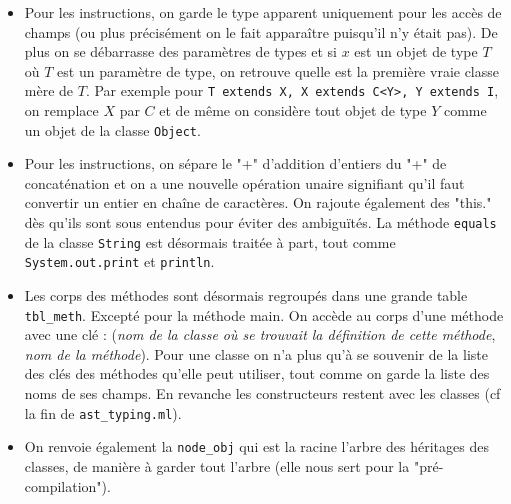 \documentclass[12pt,a4paper]{report}
\begin{document}
\begin{itemize}[label=\textbullet]
\item Pour les instructions, on garde le type apparent uniquement pour les accès de champs (ou plus précisément on le fait apparaître puisqu'il n'y était pas). De plus on se débarrasse des paramètres de types et si $x$ est un objet de type $T$ où $T$ est un paramètre de type, on retrouve quelle est la première vraie classe mère de $T$. Par exemple pour \texttt{T extends X, X extends C<Y>, Y extends I}, on remplace $X$ par $C$ et de même on considère tout objet de type $Y$ comme un objet de la classe \texttt{Object}.
\item Pour les instructions, on sépare le "+" d'addition d'entiers du "+" de concaténation et on a une nouvelle opération unaire signifiant qu'il faut convertir un entier en chaîne de caractères. On rajoute également des "this." dès qu'ils sont sous entendus pour éviter des ambiguïtés. La méthode \texttt{equals} de la classe \texttt{String} est désormais traitée à part, tout comme \texttt{System.out.print} et \texttt{println}. 
\item Les corps des méthodes sont désormais regroupés dans une grande table \texttt{tbl\_meth}. Excepté pour la méthode main. On accède au corps d'une méthode avec une clé : (\textit{nom de la classe où se trouvait la définition de cette méthode}, \textit{nom de la méthode}). Pour une classe on n'a plus qu'à se souvenir de la liste des clés des méthodes qu'elle peut utiliser, tout comme on garde la liste des noms de ses champs. En revanche les constructeurs restent avec les classes (cf la fin de \texttt{ast\_typing.ml}).
\item On renvoie également la \texttt{node\_obj} qui est la racine l'arbre des héritages des classes, de manière à garder tout l'arbre (elle nous sert pour la "pré-compilation").
\end{itemize}
\end{document}
